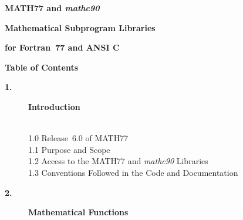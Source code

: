\documentclass[twoside]{MATH77}
\begin{document}
\begtoc


\centerline{\LARGE \bf MATH77 and {\em mathc90}}\vspace{15pt}

\centerline{\Large \bf Mathematical Subprogram Libraries}
\vspace{5pt}

\centerline{\Large \bf for Fortran~77 and ANSI C}
\vspace{20pt}

\centerline{\Large \bf Table of Contents}\vspace{10pt}

\begin{description}
\item[\large \bf 1.]  {\large {\bf Introduction}}

\vspace{-20pt}
\begin{tabbing}
\hspace{.45in}\=\\
\phantom{1}1.0 \> Release~6.0 of MATH77\\
\phantom{1}1.1 \> Purpose and Scope\\
\phantom{1}1.2 \> Access to the MATH77 and {\em mathc90} Libraries\\
\phantom{1}1.3 \> Conventions Followed in the Code and Documentation\\
\end{tabbing}\vspace{-15pt}

\item[\large \bf 2.]  {\large {\bf Mathematical Functions}}


\end{description}
\end{document}
